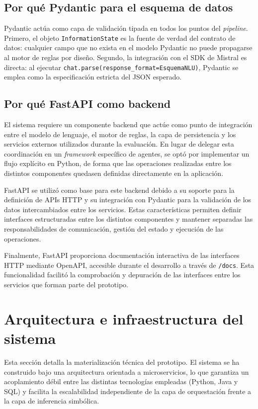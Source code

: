 \documentclass[12pt,a4paper]{report}
\begin{document}
\subsection{Por qué Pydantic para el esquema de datos}

Pydantic actúa como capa de validación tipada en todos los puntos del \textit{pipeline}. Primero, el objeto \texttt{InformationState} es la fuente de verdad del contrato de datos: cualquier campo que no exista en el modelo Pydantic no puede propagarse al motor de reglas por diseño. Segundo, la integración con el SDK de Mistral es directa: al ejecutar \texttt{chat.parse(response\_format=EsquemaNLU)}, Pydantic se emplea como la especificación estricta del JSON esperado.

\subsection{Por qué FastAPI como backend}

El sistema requiere un componente backend que actúe como punto de integración entre el modelo de lenguaje, el motor de reglas, la capa de persistencia y los servicios externos utilizados durante la evaluación. En lugar de delegar esta coordinación en un \textit{framework} específico de agentes, se optó por implementar un flujo explícito en Python, de forma que las operaciones realizadas entre los distintos componentes quedasen definidas directamente en la aplicación.

FastAPI se utilizó como base para este backend debido a su soporte para la definición de APIs HTTP y su integración con Pydantic para la validación de los datos intercambiados entre los servicios. Estas características permiten definir interfaces estructuradas entre los distintos componentes y mantener separadas las responsabilidades de comunicación, gestión del estado y ejecución de las operaciones.

Finalmente, FastAPI proporciona documentación interactiva de las interfaces HTTP mediante OpenAPI, accesible durante el desarrollo a través de \texttt{/docs}. Esta funcionalidad facilitó la comprobación y depuración de las interfaces entre los servicios que forman parte del prototipo.


\section{Arquitectura e infraestructura del sistema}

Esta sección detalla la materialización técnica del prototipo. El sistema se ha construido bajo una arquitectura orientada a microservicios, lo que garantiza un acoplamiento débil entre las distintas tecnologías empleadas (Python, Java y SQL) y facilita la escalabilidad independiente de la capa de orquestación frente a la capa de inferencia simbólica.
\end{document}
